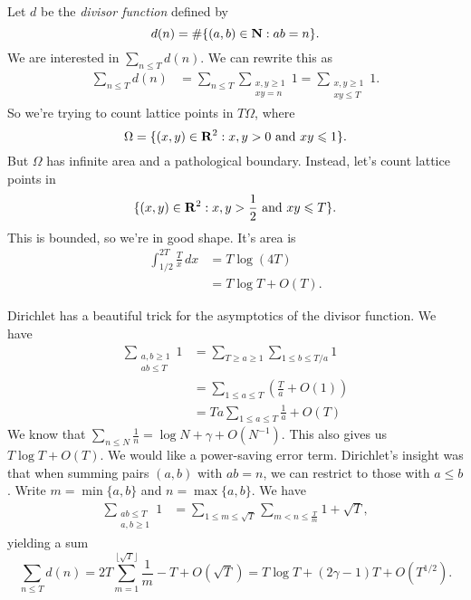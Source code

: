 \begin{example}
Let $d$ be the \emph{divisor function} defined by 
\[
  d(n) = \#\{(a,b)\in \mathbf{N}:a b=n\} .
\]
We are interested in $\sum_{n\leqslant T} d(n)$. We can rewrite this as 
\begin{align*}
  \sum_{n\leqslant T} d(n) &= \sum_{n\leqslant T} \sum_{\substack{x,y\geqslant 1 \\ x y = n}} 1 = \sum_{\substack{x,y\geqslant 1 \\ x y\leqslant T}} 1 .
\end{align*}
So we're trying to count lattice points in $T\Omega$, where 
\[
  \Omega=\{(x,y)\in \mathbf{R}^2:x,y>0\text{ and }x y\leqslant 1\} .
\]
But $\Omega$ has infinite area and a pathological boundary. Instead, let's 
count lattice points in 
\[
  \{(x,y)\in \mathbf{R}^2:x,y>\frac 1 2\text{ and }x y\leqslant T\} .
\]
This is bounded, so we're in good shape. It's area is 
\begin{align*}
  \int_{1/2}^{2 T} \frac{T}{x}\, d x 
    &= T \log(4 T) \\
    &= T\log T+O(T) .
\end{align*}
\end{example}

Dirichlet has a beautiful trick for the asymptotics of the divisor function. We 
have 
\begin{align*}
  \sum_{\substack{a,b\geqslant 1 \\ a b\leqslant T}} 1 
    &= \sum_{T\geqslant a\geqslant 1} \sum_{1\leqslant b\leqslant T/a} 1 \\
    &= \sum_{1\leqslant a\leqslant T}\left(\frac T a+O(1)\right) \\
    &= T a\sum_{1\leqslant a\leqslant T} \frac 1 a + O(T) 
\end{align*}
We know that $\sum_{n\leqslant N} \frac 1 n = \log N+\gamma+O(N^{-1})$. This 
also gives us $T\log T+O(T)$. We would like a power-saving error term. 
Dirichlet's insight was that when summing pairs $(a,b)$ with $a b=n$, we can 
restrict to those with $a\leqslant b$. Write $m=\min\{a,b\}$ and 
$n=\max\{a,b\}$. We have 
\begin{align*}
  \sum_{\substack{a b\leqslant T \\ a,b\geqslant 1}} 1
    &= \sum_{1\leqslant m \leqslant \sqrt T} \sum_{m<n \leqslant \frac{T}{m}} 1+\sqrt T ,
\end{align*}
yielding a sum 
\[
  \sum_{n\leqslant T} d(n) = 2 T \sum_{m=1}^{\lfloor \sqrt T\rfloor} \frac 1 m - T+O(\sqrt T) = T\log T+(2\gamma-1)T + O(T^{1/2}) .
\]





